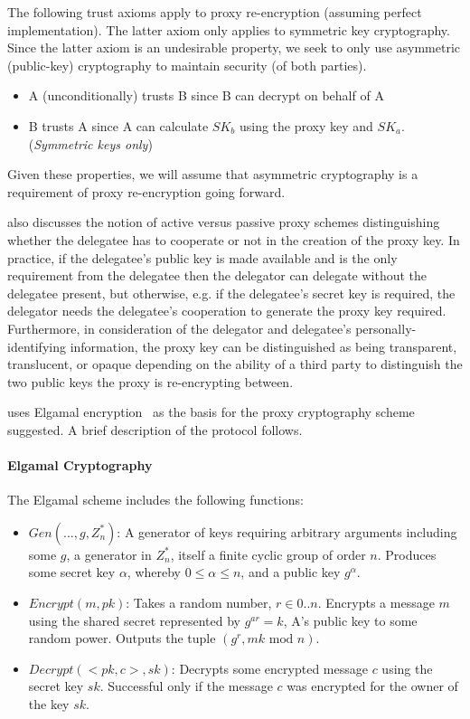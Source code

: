 The following trust axioms apply to proxy re-encryption (assuming perfect implementation). The latter axiom only applies to symmetric key cryptography. Since the latter axiom is an undesirable property, we seek to only use asymmetric (public-key) cryptography to maintain security (of both parties).

\begin{itemize}
  \item A (unconditionally) trusts B since B can decrypt on behalf of A
  \item B trusts A since A can calculate $SK_b$ using the proxy key and $SK_a$. (\textit{Symmetric keys only})
\end{itemize}

Given these properties, we will assume that asymmetric cryptography is a requirement of proxy re-encryption going forward.

\cite{bbs:1998:book} also discusses the notion of active versus passive proxy schemes distinguishing whether the delegatee has to cooperate or not in the creation of the proxy key. In practice, if the delegatee's public key is made available and is the only requirement from the delegatee then the delegator can delegate without the delegatee present, but otherwise, e.g. if the delegatee's secret key is required, the delegator needs the delegatee's cooperation to generate the proxy key required. Furthermore, in consideration of the delegator and delegatee's personally-identifying information, the proxy key can be distinguished as being transparent, translucent, or opaque depending on the ability of a third party to distinguish the two public keys the proxy is re-encrypting between.

\cite{bbs:1998:book} uses Elgamal encryption~\cite{elgamal:1985:article} as the basis for the proxy cryptography scheme suggested. A brief description of the protocol follows.

\paragraph{Elgamal Cryptography}

The Elgamal scheme includes the following functions:

\begin{itemize}
  \item $Gen(..., g, Z_n^*)$: A generator of keys requiring arbitrary arguments including some $g$, a generator in $Z_n^*$, itself a finite cyclic group of order $n$. Produces some secret key $\alpha$, whereby $0 \le \alpha \le n$, and a public key $g^\alpha$.
  \item $Encrypt(m, pk)$: Takes a random number, $r \in {0..n}$. Encrypts a message $m$ using the shared secret represented by $g^{ar} = k$, A's public key to some random power. Outputs the tuple $(g^r, mk \text{ mod } n)$.
  \item $Decrypt(<pk, c>, sk)$: Decrypts some encrypted message $c$ using the secret key $sk$. Successful only if the message $c$ was encrypted for the owner of the key $sk$.
\end{itemize}

